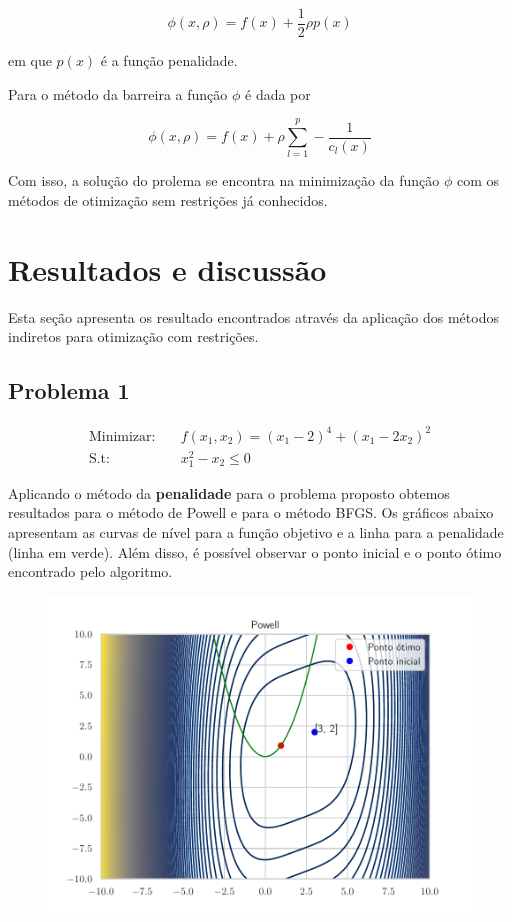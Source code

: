 \documentclass[12pt]{article}
\begin{document}
\begin{equation}
  \phi(x, \rho) = f(x) + \frac{1}{2}\rho p(x)
\end{equation}

\noindent em que $p(x)$ é a função penalidade.

Para o método da barreira a função $\phi$ é dada por 

\begin{equation}
  \phi(x, \rho) = f(x) + \rho \sum_{l=1}^{p}-\frac{1}{c_{l}(x)}
\end{equation}

Com isso, a solução do prolema se encontra na minimização da função $\phi$ com os métodos de otimização sem restrições já conhecidos.

\section{Resultados e discussão}

Esta seção apresenta os resultado encontrados através da aplicação dos métodos indiretos para otimização com restrições.

\subsection{Problema 1}

\begin{equation}
  \begin{aligned}
      \text{Minimizar:} \quad & f(x_1, x_2) = (x_1 - 2)^4 + (x_1 - 2x_2)^2 \\
      \text{S.t:} \quad & x_1^2 - x_2 \leq 0
  \end{aligned}
\end{equation}

Aplicando o método da \textbf{penalidade} para o problema proposto obtemos resultados para o método de Powell e para o método BFGS. Os gráficos abaixo apresentam as curvas de nível para a função objetivo e a linha para a penalidade (linha em verde). Além disso, é possível observar o ponto inicial e o ponto ótimo encontrado pelo algoritmo.

\begin{figure}[H]
  \centering
  \includegraphics[scale = 0.6]{penalidade_Powell_[3 2].pdf}
\end{figure}
\end{document}
